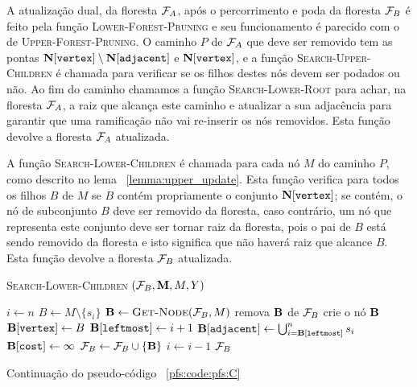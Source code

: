 A atualização dual, da floresta $\mathcal{F}_A$, após o percorrimento e 
poda da floresta $\mathcal{F}_B$ é feito pela função 
\textsc{Lower-Forest-Pruning} e seu funcionamento é parecido com o de
\textsc{Upper-Forest-Pruning}. O caminho $P$ de $\mathcal{F}_A$ que deve 
ser removido tem as pontas 
$\mathbf N[\texttt{vertex}] \setminus \mathbf N[\texttt{adjacent}]$
e $\mathbf N[\texttt{vertex}]$, e a função 
\textsc{Search-Upper-Children} é chamada para verificar se os filhos 
destes nós devem ser podados ou não. Ao fim do caminho chamamos a função 
\textsc{Search-Lower-Root} para achar, na floresta $\mathcal{F}_A$, a raiz
que alcança este caminho e atualizar a sua adjacência para garantir que 
uma ramificação não vai re-inserir os nós removidos. Esta função devolve 
a floresta $\mathcal{F}_A$ atualizada.

\newpage
A função \textsc{Search-Lower-Children} é chamada para cada nó $M$ do 
caminho $P$, como descrito no lema ~\ref{lemma:upper_update}. Esta 
função verifica para todos os filhos $B$ de $M$ se $B$ contém 
propriamente o conjunto $\mathbf N[\texttt{vertex}]$; se contém, o 
nó de subconjunto $B$ deve ser removido da floresta, caso 
contrário, um nó que representa este conjunto deve ser tornar raiz da 
floresta, pois o pai de $B$ está sendo removido da floresta e isto 
significa que não haverá raiz que alcance $B$. Esta função
devolve a floresta $\mathcal{F}_B$ atualizada.

\begin{algorithm}[H]
\textsc{Search-Lower-Children} $(\mathcal{F}_B, \mathbf M, M, Y)$
\begin{algorithmic}[1]
    \State $i \gets n$
        \State $B \gets M \setminus \{s_i\}$
            \State $\mathbf B \gets {\normalfont\textsc{Get-Node}} (\mathcal{F}_B, M)$
                \State remova $\mathbf B$ de $\mathcal{F}_B$
            \EndIf
        \Else
            \State crie o nó $\mathbf B$
            \State $\mathbf B[\texttt{vertex}] \gets B$
            \State $\mathbf B[\texttt{leftmost}] \gets i + 1$
            \State $\mathbf B[\texttt{adjacent}] \gets \bigcup_{i=\mathbf B[\texttt{leftmost}]}^{n} s_i$
            \State $\mathbf B[\texttt{cost}] \gets \infty$
            \State $\mathcal{F}_B \gets \mathcal{F}_B \cup \{\mathbf B\}$ 
        \EndIf
        \State $i \gets i - 1$
        \Return $\mathcal{F}_B$
    \EndWhile
\end{algorithmic}
\caption{Continuação do pseudo-código ~\ref{pfs:code:pfs:C}}
\label{pfs:code:pfs:D}
\end{algorithm}


